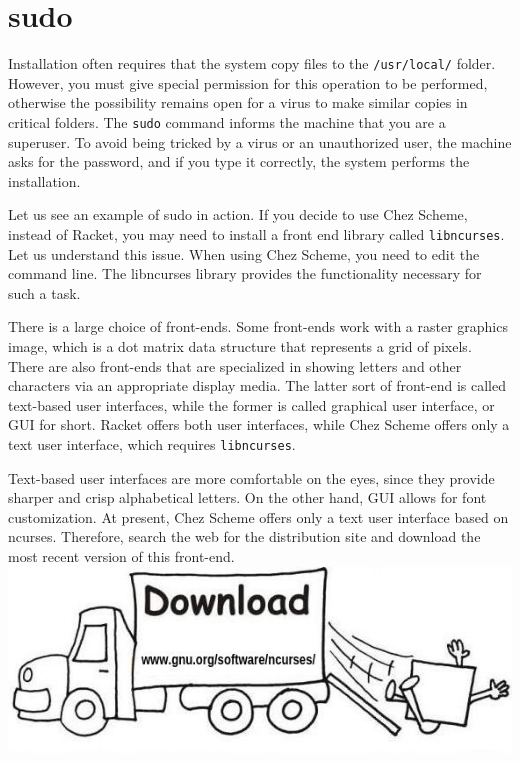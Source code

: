 \documentclass[a4paper,12pt]{book}
\begin{document}
\section{sudo}

Installation often requires that the
system copy files to the \verb|/usr/local/|
folder. However, you must give special
permission for this operation to be performed,
otherwise the possibility remains open for
a virus to make similar copies in critical folders.
The \verb|sudo| command informs the machine that you
are a superuser. To avoid being tricked by a virus
or an unauthorized user, the machine asks for the
password, and if you type it correctly,
the system performs the installation.

Let us see an example of sudo in action.
If you decide to use Chez Scheme, instead
of Racket, you may need to install a front end
library called \verb|libncurses|. Let us understand
this issue. When using Chez Scheme, you need to
edit the command line. The libncurses library provides
the functionality necessary for such a task.

There is a large choice of front-ends. Some front-ends 
work with a raster graphics image, which  is a dot matrix 
data structure that represents a grid of pixels. 
There are also front-ends that are specialized in
showing letters and other characters via an appropriate
display media. The latter sort of front-end is called
text-based user interfaces, while the former is called
graphical user interface, or GUI for short. Racket offers
both user interfaces, while Chez Scheme offers only
a text user interface, which requires \verb|libncurses|.

Text-based user interfaces are more comfortable on the
eyes, since they  provide sharper and crisp alphabetical
letters. On the other hand, GUI allows for font
customization. At present, Chez Scheme offers only a text
user interface based on ncurses. Therefore, search the web
for the distribution site and download the most recent
version of this front-end.\\

\includegraphics[scale=0.6]{figs-prefix/download.jpg}
\end{document}
